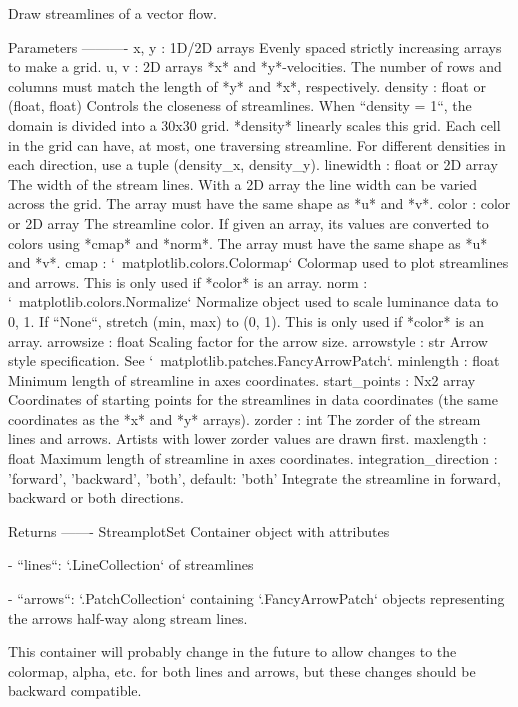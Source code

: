\begin{DoxyVerb}Draw streamlines of a vector flow.

Parameters
----------
x, y : 1D/2D arrays
    Evenly spaced strictly increasing arrays to make a grid.
u, v : 2D arrays
    *x* and *y*-velocities. The number of rows and columns must match
    the length of *y* and *x*, respectively.
density : float or (float, float)
    Controls the closeness of streamlines. When ``density = 1``, the domain
    is divided into a 30x30 grid. *density* linearly scales this grid.
    Each cell in the grid can have, at most, one traversing streamline.
    For different densities in each direction, use a tuple
    (density_x, density_y).
linewidth : float or 2D array
    The width of the stream lines. With a 2D array the line width can be
    varied across the grid. The array must have the same shape as *u*
    and *v*.
color : color or 2D array
    The streamline color. If given an array, its values are converted to
    colors using *cmap* and *norm*.  The array must have the same shape
    as *u* and *v*.
cmap : `~matplotlib.colors.Colormap`
    Colormap used to plot streamlines and arrows. This is only used if
    *color* is an array.
norm : `~matplotlib.colors.Normalize`
    Normalize object used to scale luminance data to 0, 1. If ``None``,
    stretch (min, max) to (0, 1). This is only used if *color* is an array.
arrowsize : float
    Scaling factor for the arrow size.
arrowstyle : str
    Arrow style specification.
    See `~matplotlib.patches.FancyArrowPatch`.
minlength : float
    Minimum length of streamline in axes coordinates.
start_points : Nx2 array
    Coordinates of starting points for the streamlines in data coordinates
    (the same coordinates as the *x* and *y* arrays).
zorder : int
    The zorder of the stream lines and arrows.
    Artists with lower zorder values are drawn first.
maxlength : float
    Maximum length of streamline in axes coordinates.
integration_direction : {'forward', 'backward', 'both'}, default: 'both'
    Integrate the streamline in forward, backward or both directions.

Returns
-------
StreamplotSet
    Container object with attributes

    - ``lines``: `.LineCollection` of streamlines

    - ``arrows``: `.PatchCollection` containing `.FancyArrowPatch`
      objects representing the arrows half-way along stream lines.

    This container will probably change in the future to allow changes
    to the colormap, alpha, etc. for both lines and arrows, but these
    changes should be backward compatible.
\end{DoxyVerb}
 